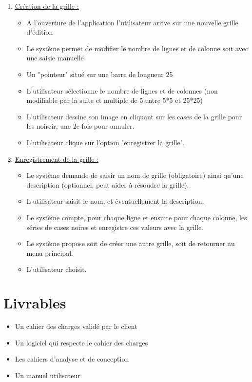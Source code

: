 \documentclass[a4paper, 12pt, twoside]{article}
\begin{document}
\begin{enumerate}\setlength{\itemsep}{5mm}

	\item{\ul{Cr\'eation de la grille :}}\newline
	\begin{itemize}	\setlength{\itemsep}{3mm}
		\item A l'ouverture de l'application l'utilisateur arrive sur une nouvelle grille d'édition
		\item Le système permet de modifier le nombre de lignes et de colonne soit avec une saisie manuelle
		\item Un "pointeur" situé sur une barre de longueur 25\newline
		\item L'utilisateur sélectionne le nombre de lignes et de colonnes (non modifiable par la suite et multiple de 5 entre 5*5 et 25*25)
		\item L'utilisateur dessine son image en cliquant sur les cases de la grille pour les noircir, une 2e fois pour annuler.
		\item L'utilisateur clique sur l'option "enregistrer la grille".
	\end{itemize}
	
	\item{\ul{Enregistrement de la grille :}}\newline
	\begin{itemize}	\setlength{\itemsep}{5mm}
		\item Le système demande de saisir un nom de grille (obligatoire) ainsi qu'une description (optionnel, peut aider à résoudre la grille).
		\item L'utilisateur saisit le nom, et éventuellement la description.
		\item Le système compte, pour chaque ligne et ensuite pour chaque colonne, les séries de cases noires et enregistre ces valeurs avec la grille.
		\item Le système propose soit de créer une autre grille, soit de retourner au menu principal.
		\item L'utilisateur choisit.
	\end{itemize}
\end{enumerate}

\section{Livrables}

\begin{itemize}\setlength{\itemsep}{3mm}

 \item[\textbullet] Un cahier des charges validé par le client
 \item[\textbullet] Un logiciel qui respecte le cahier des charges
 \item[\textbullet] Les cahiers d'analyse et de conception
 \item[\textbullet] Un manuel utilisateur
 
\end{itemize}
\end{document}
